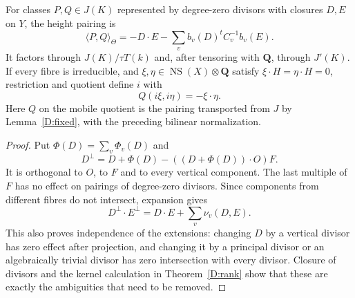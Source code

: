 \begin{theorem}
\label{D:height}
For classes $P,Q\in J(K)$ represented by degree-zero divisors with
closures $D,E$ on $Y$, the height pairing is
\[
 \boxed{\langle P,Q\rangle_\Theta
             =-D\cdot E-\sum_v b_v(D)^tC_v^{-1}b_v(E).}
\]
It factors through $J(K)/\tau T(k)$ and, after tensoring with
$\mathbf Q$, through $J'(K)$.  If every fibre is irreducible, and
$\xi,\eta\in\operatorname{NS}(X)\otimes\mathbf Q$ satisfy
$\xi\cdot H=\eta\cdot H=0$, restriction and quotient define $i$ with
\[
                   \boxed{Q(i\xi,i\eta)=-\xi\cdot\eta.}
\]
Here $Q$ on the mobile quotient is the pairing transported from $J$ by
Lemma~\ref{D:fixed}, with the preceding bilinear normalization.
\end{theorem}
\begin{proof}
Put $\Phi(D)=\sum_v\Phi_v(D)$ and
\[
 D^\perp=D+\Phi(D)-((D+\Phi(D))\cdot O)F.
\]
It is orthogonal to $O$, to $F$ and to every vertical component.  The
last multiple of $F$ has no effect on pairings of degree-zero divisors.
Since components from different fibres do not intersect, expansion gives
\[
 D^\perp\cdot E^\perp
       =D\cdot E+\sum_v\nu_v(D,E).
\]
This also proves independence of the extensions: changing $D$ by a
vertical divisor has zero effect after projection, and changing it by
a principal divisor or an algebraically trivial divisor has zero
intersection with every divisor.  Closure of divisors and the kernel
calculation in Theorem~\ref{D:rank} show that these are exactly the
ambiguities that need to be removed.


\end{proof}
